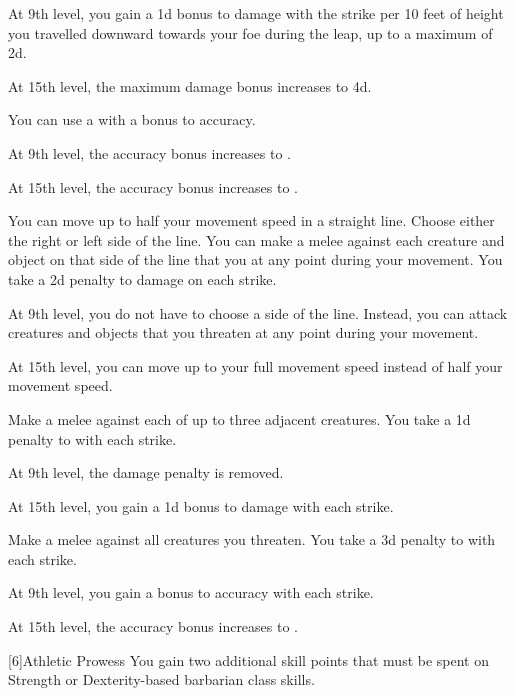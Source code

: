 {            At 9th level, you gain a \plus1d bonus to damage with the strike per 10 feet of height you travelled downward towards your foe during the leap, up to a maximum of \plus2d.
            \par At 15th level, the maximum damage bonus increases to \plus4d.

             You can use a  with a  bonus to accuracy.

            At 9th level, the accuracy bonus increases to .
            \par At 15th level, the accuracy bonus increases to .

             You can move up to half your movement speed in a straight line.
            Choose either the right or left side of the line.
            You can make a melee  against each creature and object on that side of the line that you  at any point during your movement.
            You take a \minus2d penalty to damage on each strike.

            At 9th level, you do not have to choose a side of the line.
            Instead, you can attack creatures and objects that you threaten at any point during your movement.
            \par At 15th level, you can move up to your full movement speed instead of half your movement speed.

             Make a melee  against each of up to three adjacent creatures.
            You take a \minus1d penalty to  with each strike.

            At 9th level, the damage penalty is removed.
            \par At 15th level, you gain a \plus1d bonus to damage with each strike.

             Make a melee  against all creatures you threaten.
            You take a \minus3d penalty to  with each strike.

            At 9th level, you gain a  bonus to accuracy with each strike.
            \par At 15th level, the accuracy bonus increases to .
        }

        [6]{Athletic Prowess} You gain two additional skill points that must be spent on Strength or Dexterity-based barbarian class skills.

